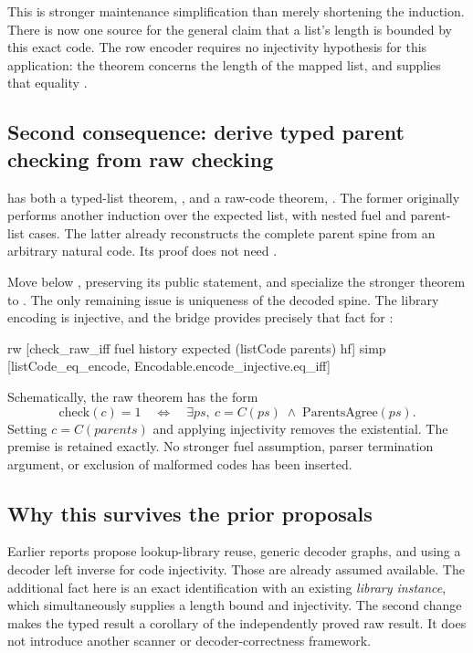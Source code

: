 This is stronger maintenance simplification than merely shortening the
induction. There is now one source for the general claim that a list's
length is bounded by this exact code. The row encoder requires no
injectivity hypothesis for this application: the theorem concerns the
length of the mapped list, and  supplies that equality
\cite{renamecode,mathlist}.

\subsection{Second consequence: derive typed parent checking from raw checking}

 has both a typed-list theorem,
, and a raw-code theorem, . The former
originally performs another induction over the expected list, with nested
fuel and parent-list cases. The latter already reconstructs the complete
parent spine from an arbitrary natural code. Its proof does not need
 \cite{parents}.

Move  below , preserving its public
statement, and specialize the stronger theorem to .
The only remaining issue is uniqueness of the decoded spine. The library
encoding is injective, and the bridge provides precisely that fact for
:
\begin{lean}
  rw [check_raw_iff fuel history expected (listCode parents) hf]
  simp [listCode_eq_encode, Encodable.encode_injective.eq_iff]
\end{lean}

Schematically, the raw theorem has the form
\[
\mathrm{check}(c)=1
\quad\Longleftrightarrow\quad
\exists ps,\ c=C(ps)\;\land\;\mathrm{ParentsAgree}(ps).
\]
Setting \(c=C(parents)\) and applying injectivity removes the existential.
The premise  is retained exactly. No stronger
fuel assumption, parser termination argument, or exclusion of malformed
codes has been inserted.

\subsection{Why this survives the prior proposals}

Earlier reports propose lookup-library reuse, generic decoder graphs, and
using a decoder left inverse for code injectivity. Those are already
assumed available. The additional fact here is an exact identification with
an existing \emph{library instance}, which simultaneously supplies a length
bound and injectivity. The second change makes the typed result a corollary
of the independently proved raw result.
It does not introduce another scanner or decoder-correctness framework.

